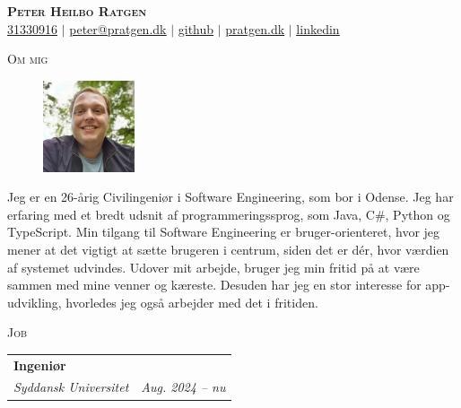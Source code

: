 \documentclass[11pt]{article}
\makeatletter
\newcommand{\resumeSubheading}[4]{
  \noindent\begin{tabular*}{0.98\textwidth}[t]{l@{\extracolsep{\fill}}r}
    \noindent \textbf{#3} & \textit{\small #2} \\ \vspace{-3pt} 
    \noindent \textit{\small #1} & \textit{\small #4} 
  \end{tabular*}\vspace{7pt}
}
\makeatother
\begin{document}
\begin{center}
  \textbf{\huge{\scshape{Peter Heilbo Ratgen}}}\\ 
  \vspace{0.2cm}
  \small \href{tel:+4531330916}{31330916} $|$
  \href{mailto:peter@pratgen.dk}{\underline{peter@pratgen.dk}} $|$
  \href{https://github.com/ratgen}{\underline{github}} $|$
  \href{https://pratgen.dk}{\underline{pratgen.dk}} $|$
  \href{https://www.linkedin.com/in/peter-ratgen-a1236529/}{\underline{linkedin}}
\end{center}

\noindent\large{\scshape{Om mig}} \newline
\noindent{\rule[0.3cm]{\textwidth}{0.4pt}}

\begin{figure}
  \vspace{-0.7cm}
  \includegraphics[width=0.24\textwidth, right]{./profile.jpg}
\end{figure}
\normalsize Jeg er en 26-årig Civilingeniør i Software Engineering, som bor i
Odense. Jeg har erfaring med et bredt udsnit af programmeringssprog, som Java,
C\#, Python og TypeScript. Min tilgang til Software Engineering er bruger-orienteret,
hvor jeg mener at det vigtigt at sætte brugeren i centrum, siden det er dér,
hvor værdien af systemet udvindes.
Udover mit arbejde, bruger jeg min fritid på at være sammen med mine
venner og kæreste. Desuden har jeg en stor interesse for app-udvikling,
hvorledes jeg også arbejder med det i fritiden.

\vspace{0.3cm}
\noindent\large{\scshape{Job}} \newline
\noindent{\rule[0.3cm]{\textwidth}{0.4pt}}

\resumeSubheading{Syddansk Universitet}{}{Ingeniør}{Aug. 2024 -- nu}\\
\vspace{0.3cm}
\end{document}
